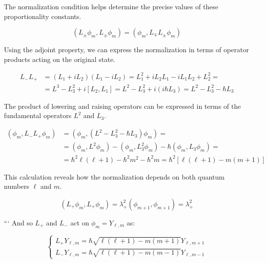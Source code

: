 \documentclass[italian]{HKNdocument}
\begin{document}
The normalization condition helps determine the precise values of these proportionality constants.

\begin{equation*}
\left(L_{ \pm} \phi_{m}, L_{ \pm} \phi_{m}\right)=\left(\phi_{m}, L_{\mp} L_{ \pm} \phi_{m}\right) \tag{8.18}
\end{equation*}

Using the adjoint property, we can express the normalization in terms of operator products acting on the original state.

\begin{align*}
L_{-} L_{+} & =\left(L_{1}+i L_{2}\right)\left(L_{1}-i L_{2}\right)=L_{1}^{2}+i L_{2} L_{1}-i L_{1} L_{2}+L_{2}^{2}= \\
& =L^{3}-L_{3}^{2}+i\left[L_{2}, L_{1}\right]=L^{2}-L_{3}^{2}+i\left(i \hbar L_{3}\right)=L^{2}-L_{3}^{2}-\hbar L_{3} \tag{8.19}
\end{align*}

The product of lowering and raising operators can be expressed in terms of the fundamental operators $L^2$ and $L_3$.

\begin{align*}
\left(\phi_{m}, L_{-} L_{+} \phi_{m}\right) & =\left(\phi_{m},\left(L^{2}-L_{3}^{2}-\hbar L_{3}\right) \phi_{m}\right)= \\
& =\left(\phi_{m}, L^{2} \phi_{m}\right)-\left(\phi_{m}, L_{3}^{2} \phi_{m}\right)-\hbar\left(\phi_{m}, L_{3} \phi_{m}\right)=  \tag{8.20}\\
& =\hbar^{2} \ell(\ell+1)-\hbar^{2} m^{2}-\hbar^{2} m=\hbar^{2}[\ell(\ell+1)-m(m+1)]
\end{align*}

This calculation reveals how the normalization depends on both quantum numbers $\ell$ and $m$.

\begin{equation*}
\left(L_{+} \phi_{m}, L_{+} \phi_{m}\right)=\lambda_{+}^{2}\left(\phi_{m+1}, \phi_{m+1}\right)=\lambda_{+}^{2} \tag{8.21}
\end{equation*}

```
And so $L_{+}$ and $L_{-}$ act on $\phi_{m}=Y_{\ell, m}$ as:

\[
\left\{\begin{array}{l}
L_{+} Y_{\ell, m}=\hbar \sqrt{\ell(\ell+1)-m(m+1)} Y_{\ell, m+1}  \tag{8.22}\\
L_{-} Y_{\ell, m}=\hbar \sqrt{\ell(\ell+1)-m(m-1)} Y_{\ell, m-1}
\end{array}\right.
\]
\end{document}
